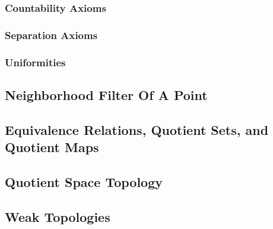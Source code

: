 \subsubsection{Countability  Axioms}





\subsubsection{Separation Axioms}

\subsubsection{Uniformities}

%


\subsection{Neighborhood Filter Of A Point}



\subsection{Equivalence Relations, Quotient Sets, and Quotient Maps}

 

 



\subsection{Quotient Space Topology}


\subsection{Weak Topologies}

